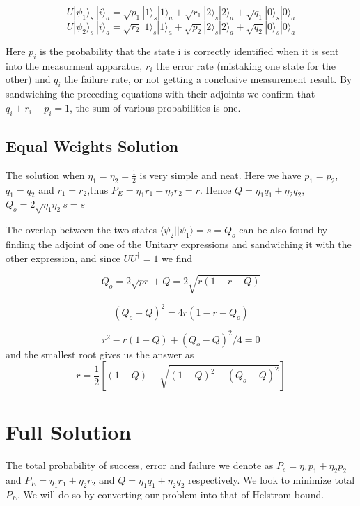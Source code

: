 \documentclass[12pt,oneside,english,reqno]{amsbook}
\numberwithin{section}{chapter}
\numberwithin{equation}{section}
\numberwithin{figure}{section}
\newcommand{\br}[1]{\langle #1|}
\newcommand{\ke}[1]{|#1\rangle}
\begin{document}
\[
U|\psi_{1}\rangle_{s}\ |i\rangle_{a}=\sqrt{p_{1}}|1\rangle_{s}|1\rangle_{a}+\sqrt{r_{1}}|2\rangle_{s}|2\rangle_{a}+\sqrt{q_{1}}|0\rangle_{s}|0\rangle_{a}
\]
\[
U|\psi_{2}\rangle_{s}\ |i\rangle_{a}=\sqrt{r_{2}}|1\rangle_{s}|1\rangle_{a}+\sqrt{p_{2}}|2\rangle_{s}|2\rangle_{a}+\sqrt{q_{2}}|0\rangle_{s}|0\rangle_{a}
\]


Here $p_{i}$ is the probability that the state i is correctly identified
when it is sent into the measurment apparatus, $r_{i}$ the error
rate (mistaking one state for the other) and $q_{i}$ the failure
rate, or not getting a conclusive measurement result. By sandwiching
the preceding equations with their adjoints we confirm that $q_{i}+r_{i}+p_{i}=1$,
the sum of various probabilities is one.


\subsection{Equal Weights Solution}

The solution when $\eta_{1}=\eta_{2}=\frac{1}{2}$ is very simple
and neat. Here we have $p_{1}=p_{2}$, $q_{1}=q_{2}$ and $r_{1}=r_{2}$,thus
$P_{E}=\eta_{1}r_{1}+\eta_{2}r_{2}=r$. Hence $Q=\eta_{1}q_{1}+\eta_{2}q_{2}$,
$Q_{o}=2\sqrt{\eta_{1}\eta_{2}}s=s$ 

The overlap between the two states $\br{\psi_{2}}\ke{\psi_{1}}=s=Q_{o}$
can be also found by finding the adjoint of one of the Unitary expressions
and sandwiching it with the other expression, and since $UU^{\dagger}=1$
we find

\[
Q_{o}=2\sqrt{pr}+Q=2\sqrt{r(1-r-Q)}
\]
 
\[
(Q_{o}-Q)^{2}=4r(1-r-Q_{o})
\]
 
\[
r^{2}-r(1-Q)+(Q_{o}-Q)^{2}/4=0
\]
and the smallest root gives us the answer as 
\[
r=\frac{1}{2}[(1-Q)-\sqrt{(1-Q)^{2}-(Q_{o}-Q)^{2}}]
\]





\section{Full Solution}

The total probability of success, error and failure we denote as $P_{s}=\eta_{1}p_{1}+\eta_{2}p_{2}$
and $P_{E}=\eta_{1}r_{1}+\eta_{2}r_{2}$ and $Q=\eta_{1}q_{1}+\eta_{2}q_{2}$
respectively. We look to minimize total $P_{E}$. We will do so by
converting our problem into that of Helstrom bound. 
\end{document}

